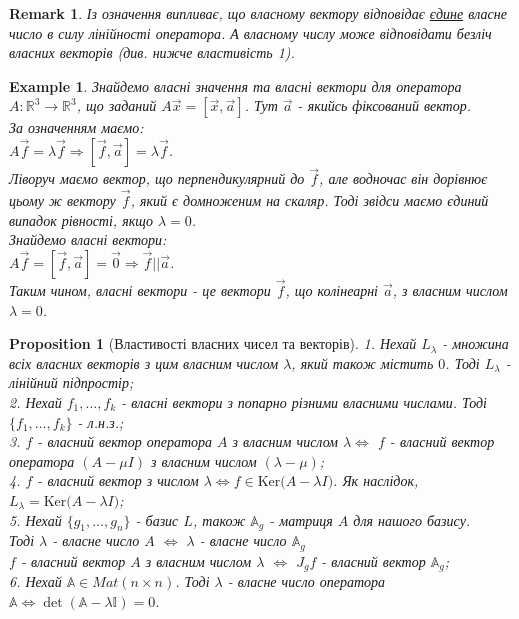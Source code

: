 \documentclass[a4paper, 10pt]{article}
\def\ker#1{\textrm{Ker} {#1}}
\theoremstyle{theoremdd}
\theoremstyle{theoremdd}
\theoremstyle{theoremdd}
\theoremstyle{theoremdd}
\newtheorem{example}[theorem]{Example}
\theoremstyle{theoremdd}
\newtheorem{proposition}[theorem]{Proposition}
\theoremstyle{theoremdd}
\newtheorem{remark}[theorem]{Remark}
\theoremstyle{theoremdd}
\theoremstyle{theoremdd}
\begin{document}
\begin{remark}
Із означення випливає, що власному вектору відповідає \underline{єдине} власне число в силу лінійності оператора. А власному числу може відповідати безліч власних векторів (див. нижче властивість 1).
\end{remark}

\begin{example}
Знайдемо власні значення та власні вектори для оператора $A: \mathbb{R}^3 \to \mathbb{R}^3$, що заданий $A\vec{x} = [\vec{x}, \vec{a}]$. Тут $\vec{a}$ - якийсь фіксований вектор.\\
За означенням маємо:\\
$A\vec{f} = \lambda \vec{f} \Rightarrow [\vec{f},\vec{a}] = \lambda \vec{f}$.\\
Ліворуч маємо вектор, що перпендикулярний до $\vec{f}$, але водночас він дорівнює цьому ж вектору $\vec{f}$, який є домноженим на скаляр. Тоді звідси маємо єдиний випадок рівності, якщо $\lambda = 0$.\\
Знайдемо власні вектори:\\
$A\vec{f} = [\vec{f}, \vec{a}] = \vec{0} \Rightarrow \vec{f} || \vec{a}$.\\
Таким чином, власні вектори - це вектори $\vec{f}$, що колінеарні $\vec{a}$, з власним числом $\lambda = 0$.
\end{example}

\begin{proposition}[Властивості власних чисел та векторів]
1. Нехай $L_{\lambda}$ - множина всіх власних векторів з цим власним числом $\lambda$, який також містить $0$. Тоді $L_{\lambda}$ - лінійний підпростір;\\
2. Нехай $f_1,\dots,f_k$ - власні вектори з попарно різними власними числами. Тоді $\{f_1,\dots,f_k\}$ - л.н.з.;\\
3. $f$ - власний вектор оператора $A$ з власним числом $\lambda \iff$ $f$ - власний вектор оператора $(A - \mu I)$ з власним числом $(\lambda - \mu)$;\\
4. $f$ - власний вектор з числом $\lambda \iff f \in \ker(A-\lambda I)$. Як наслідок, $L_{\lambda} = \ker(A-\lambda I)$;\\
5. Нехай $\{g_1,\dots,g_n\}$ - базис $L$, також $\mathbb{A}_g$ - матриця $A$ для нашого базису.\\
Тоді $\lambda$ - власне число $A$ $\iff$ $\lambda$ - власне число $\mathbb{A}_g$\\
$f$ - власний вектор $A$ з власним числом $\lambda$ $\iff$ $J_g f$ - власний вектор $\mathbb{A}_g$;\\
6. Нехай $\mathbb{A} \in Mat(n \times n)$. Тоді $\lambda$ - власне число оператора $\mathbb{A} \iff \det (\mathbb{A} - \lambda \mathbb{I}) = 0$.
\end{proposition}
\end{document}
